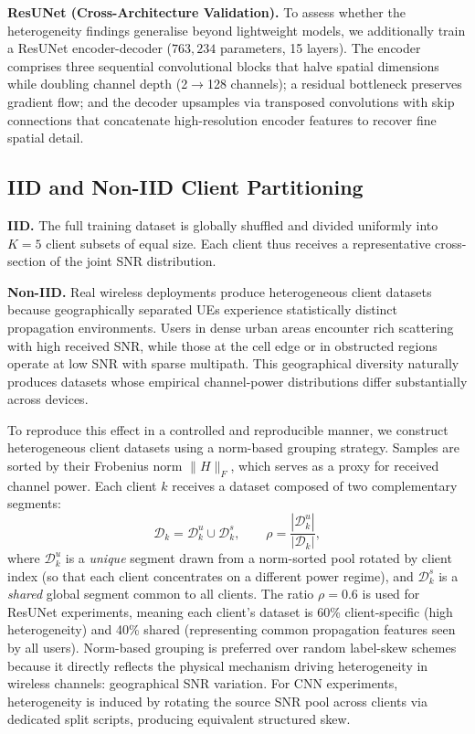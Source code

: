 \documentclass[runningheads]{llncs}
\begin{document}
\textbf{ResUNet (Cross-Architecture Validation).}
To assess whether the heterogeneity findings generalise beyond
lightweight models, we additionally train a ResUNet encoder-decoder
($763{,}234$ parameters, 15 layers).  The encoder comprises three
sequential convolutional blocks that halve spatial dimensions while
doubling channel depth (2$\to$128 channels); a residual bottleneck
preserves gradient flow; and the decoder upsamples via transposed
convolutions with skip connections that concatenate high-resolution
encoder features to recover fine spatial detail.

\subsection{IID and Non-IID Client Partitioning}
\label{ssec:partition}

\textbf{IID.} The full training dataset is globally shuffled and divided
uniformly into $K = 5$ client subsets of equal size.  Each client thus
receives a representative cross-section of the joint SNR distribution.

\textbf{Non-IID.} Real wireless deployments produce heterogeneous client
datasets because geographically separated UEs experience statistically
distinct propagation environments.  Users in dense urban areas encounter
rich scattering with high received SNR, while those at the cell edge or
in obstructed regions operate at low SNR with sparse multipath.  This
geographical diversity naturally produces datasets whose empirical
channel-power distributions differ substantially across devices.

To reproduce this effect in a controlled and reproducible manner, we
construct heterogeneous client datasets using a norm-based grouping
strategy.  Samples are sorted by their Frobenius norm $\|H\|_F$,
which serves as a proxy for received channel power.  Each client
$k$ receives a dataset composed of two complementary segments:
\begin{equation}
  \mathcal{D}_k = \mathcal{D}_k^u \cup \mathcal{D}_k^s,
  \qquad
  \rho = \frac{|\mathcal{D}_k^u|}{|\mathcal{D}_k|},
  \label{eq:noniid}
\end{equation}
where $\mathcal{D}_k^u$ is a \emph{unique} segment drawn from a
norm-sorted pool rotated by client index (so that each client
concentrates on a different power regime), and $\mathcal{D}_k^s$ is a
\emph{shared} global segment common to all clients.  The ratio
$\rho = 0.6$ is used for ResUNet experiments, meaning each client's
dataset is 60\% client-specific (high heterogeneity) and 40\% shared
(representing common propagation features seen by all users).
Norm-based grouping is preferred over random label-skew schemes because
it directly reflects the physical mechanism driving heterogeneity in
wireless channels: geographical SNR variation.  For CNN experiments,
heterogeneity is induced by rotating the source SNR pool across clients
via dedicated split scripts, producing equivalent structured skew.
\end{document}
